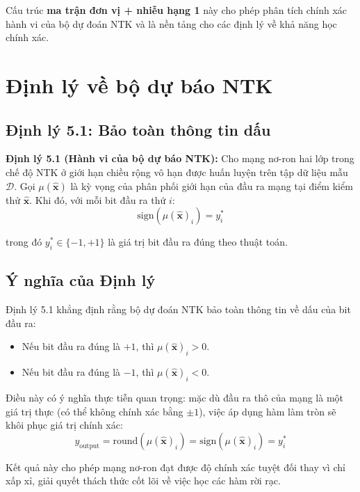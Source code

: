 Cấu trúc \textbf{ma trận đơn vị + nhiễu hạng 1} này cho phép phân tích chính xác hành vi của bộ dự đoán NTK và là nền tảng cho các định lý về khả năng học chính xác.

\section{Định lý về bộ dự báo NTK}

\subsection{Định lý 5.1: Bảo toàn thông tin dấu}

    	\textbf{Định lý 5.1 (Hành vi của bộ dự báo NTK):} Cho mạng nơ-ron hai lớp trong chế độ NTK ở giới hạn chiều rộng vô hạn được huấn luyện trên tập dữ liệu mẫu $\mathcal{D}$. Gọi $\mu(\hat{\mathbf{x}})$ là kỳ vọng của phân phối giới hạn của đầu ra mạng tại điểm kiểm thử $\hat{\mathbf{x}}$. Khi đó, với mỗi bit đầu ra thứ $i$:
\begin{equation}
    \text{sign}(\mu(\hat{\mathbf{x}})_i) = y_i^*
\end{equation}

trong đó $y_i^* \in \{-1, +1\}$ là giá trị bit đầu ra đúng theo thuật toán.

\subsection{Ý nghĩa của Định lý}

Định lý 5.1 khẳng định rằng bộ dự đoán NTK bảo toàn thông tin về dấu của bit đầu ra:
\begin{itemize}
    \item Nếu bit đầu ra đúng là $+1$, thì $\mu(\hat{\mathbf{x}})_i > 0$.
    \item Nếu bit đầu ra đúng là $-1$, thì $\mu(\hat{\mathbf{x}})_i < 0$.
\end{itemize}

Điều này có ý nghĩa thực tiễn quan trọng: mặc dù đầu ra thô của mạng là một giá trị thực (có thể không chính xác bằng $\pm 1$), việc áp dụng hàm làm tròn sẽ khôi phục giá trị chính xác:
\begin{equation}
    y_{\text{output}} = \text{round}(\mu(\hat{\mathbf{x}})_i) = \text{sign}(\mu(\hat{\mathbf{x}})_i) = y_i^*
\end{equation}

Kết quả này cho phép mạng nơ-ron đạt được độ chính xác tuyệt đối thay vì chỉ xấp xỉ, giải quyết thách thức cốt lõi về việc học các hàm rời rạc.

